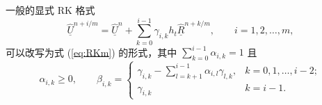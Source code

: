 \begin{lem}
一般的显式 RK 格式
\begin{equation}
\underline{\hat{U}}^{n+i/m}=\underline{\hat{U}}^{n}+\sum_{k=0}^{i-1}\gamma_{i,k}h_{t}\underline{\hat{R}}^{n+k/m},\qquad i=1,2,\dots,m,
\end{equation}
可以改写为式 (\ref{eq:RKm}) 的形式，其中 $\sum_{k=0}^{i-1}\alpha_{i,k}=1$ 且
\begin{equation}
\alpha_{i,k}\ge0,\qquad\beta_{i,k}=\begin{cases}
\gamma_{i,k}-\sum_{l=k+1}^{i-1}\alpha_{i,l}\gamma_{l,k}, & k=0,1,\dots,i-2;\\
\gamma_{i,k} & k=i-1.
\end{cases}
\end{equation}
\end{lem}

